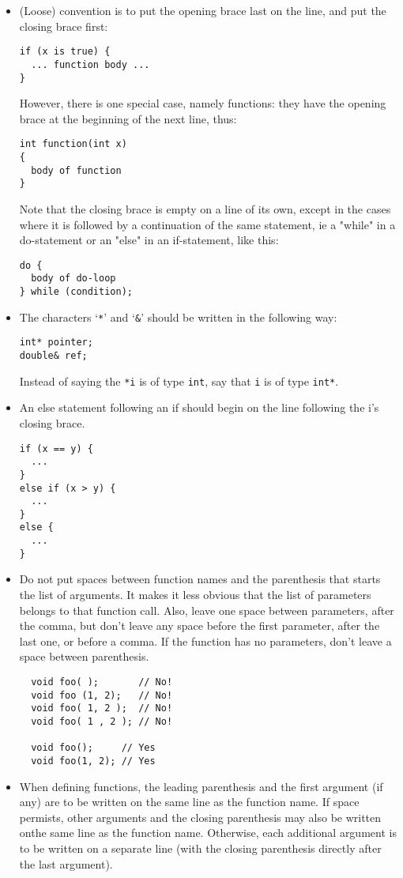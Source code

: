 \documentclass[10pt,letter,relax]{SANDreport}
\begin{document}
\begin{itemize}
\item (Loose) convention is to put the opening
brace last on the line, and put the closing brace first:
\begin{verbatim}
if (x is true) {
  ... function body ...
}
\end{verbatim}
However, there is one special case, namely functions: they have the
opening brace at the beginning of the next line, thus:
\begin{verbatim}
int function(int x)
{
  body of function
}
\end{verbatim}

Note that the closing brace is empty on a line of its own, except in
the cases where it is followed by a continuation of the same statement,
ie a "while" in a do-statement or an "else" in an if-statement, like
this:
\begin{verbatim}
do {
  body of do-loop
} while (condition);
\end{verbatim}
\item The characters `\verb!*!' and `\verb!&!' should be
written in the following way:
\begin{verbatim}
int* pointer;
double& ref;
\end{verbatim}
Instead of saying the \verb!*i! is of type \verb!int!, say that \verb!i! is of
  type \verb!int*!.
\item An else statement following an if should begin on the line following the
i's closing brace.
\begin{verbatim}
if (x == y) {
  ...
}
else if (x > y) {
  ...
}
else {
  ...
}
\end{verbatim}
\item Do not put spaces between function names and the parenthesis that
  starts the list of arguments. It makes it less obvious that the list
  of parameters belongs to that function call. Also, leave one space
  between parameters, after the comma, but don't leave any space before
  the first parameter, after the last one, or before a comma. If the
  function has no parameters, don't leave a space between parenthesis.
  \begin{verbatim}
  void foo( );       // No!
  void foo (1, 2);   // No!
  void foo( 1, 2 );  // No!
  void foo( 1 , 2 ); // No!

  void foo();     // Yes
  void foo(1, 2); // Yes
  \end{verbatim}

\item When defining functions, the leading parenthesis and the first argument
  (if any) are to be written on the same line as the function name. If space
  permists, other arguments and the closing parenthesis may also be written
  onthe same line as the function name. Otherwise, each additional argument is
  to be written on a separate line (with the closing parenthesis directly
                                    after the last argument).


\end{itemize}
\end{document}
